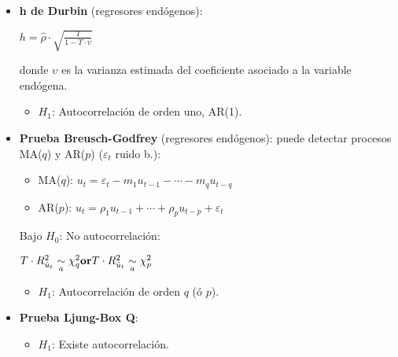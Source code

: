 \documentclass[10pt, a4paper, landscape]{extarticle}
\begin{document}
\begin{multicols}{3}
\begin{itemize}[leftmargin=*]
\begin{itemize}[leftmargin=*]
\begin{center}
		\end{center}
		\item \textbf{h de Durbin} (regresores endógenos):
		\begin{center}
			$h = \hat{\rho} \cdot \sqrt{\frac{T}{1 - T \cdot \upsilon}}$
		\end{center}
		donde $\upsilon$ es la varianza estimada del coeficiente asociado a la variable endógena.
		\begin{itemize}[leftmargin=*]
			\item $H_1$: Autocorrelación de orden uno, AR(1).
		\end{itemize}
		\item \textbf{Prueba Breusch-Godfrey} (regresores endógenos): puede detectar procesos MA($q$) y AR($p$) ($\varepsilon_t$ ruido b.):
		\begin{itemize}[leftmargin=*]
			\item MA($q$): $u_t = \varepsilon_t - m_1 u_{t - 1} - \cdots - m_q u_{t - q}$
			\item AR($p$): $u_t = \rho_1 u_{t - 1} + \cdots + \rho_p u_{t - p} + \varepsilon_t$
		\end{itemize}
		Bajo $H_0$: No autocorrelación:
		\begin{center}
			$\hfill T \cdot R^2_{\hat{u}_t} \underset{a}{\sim} \chi^2_q \hfill \textbf{or} \hfill T \cdot R^2_{\hat{u}_t} \underset{a}{\sim} \chi^2_p \hfill$
		\end{center}
		\begin{itemize}[leftmargin=*]
			\item $H_1$: Autocorrelación de orden $q$ (ó $p$).
		\end{itemize}
		\item \textbf{Prueba Ljung-Box Q}:
		\begin{itemize}[leftmargin=*]
			\item $H_1$: Existe autocorrelación.
		\end{itemize}
	\end{itemize}

\end{itemize}


\end{multicols}
\end{document}
